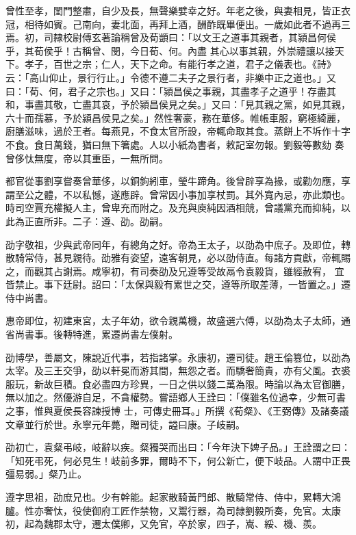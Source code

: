 \begin{pinyinscope}
 曾性至孝，閨門整肅，自少及長，無聲樂嬖幸之好。年老之後，與妻相見，皆正衣冠，相待如賓。己南向，妻北面，再拜上酒，酬酢既畢便出。一歲如此者不過再三焉。初，司隸校尉傅玄著論稱曾及荀顗曰：「以文王之道事其親者，其潁昌何侯乎，其荀侯乎！古稱曾、閔，今日荀、何。內盡
 其心以事其親，外崇禮讓以接天下。孝子，百世之宗；仁人，天下之命。有能行孝之道，君子之儀表也。《詩》云：「高山仰止，景行行止。」令德不遵二夫子之景行者，非樂中正之道也。」又曰：「荀、何，君子之宗也。」又曰：「潁昌侯之事親，其盡孝子之道乎！存盡其和，事盡其敬，亡盡其哀，予於潁昌侯見之矣。」又曰：「見其親之黨，如見其親，六十而孺慕，予於潁昌侯見之矣。」然性奢豪，務在華侈。帷帳車服，窮極綺麗，廚膳滋味，過於王者。每燕見，不食太官所設，帝輒命取其食。蒸餅上不坼作十字不食。食日萬錢，猶曰無下箸處。人以小紙為書者，敕記室勿報。劉毅等數劾
 奏曾侈忲無度，帝以其重臣，一無所問。



 都官從事劉享嘗奏曾華侈，以銅鉤紖車，瑩牛蹄角。後曾辟享為掾，或勸勿應，享謂至公之體，不以私憾，遂應辟。曾常因小事加享杖罰。其外寬內忌，亦此類也。時司空賈充權擬人主，曾卑充而附之。及充與庾純因酒相競，曾議黨充而抑純，以此為正直所非。二子：遵、劭。劭嗣。



 劭字敬祖，少與武帝同年，有總角之好。帝為王太子，以劭為中庶子。及即位，轉散騎常侍，甚見親待。劭雅有姿望，遠客朝見，必以劭侍直。每諸方貢獻，帝輒賜之，而觀其占謝焉。咸寧初，有司奏劭及兄遵等受故鬲令袁毅貨，雖經赦宥，
 宜皆禁止。事下廷尉。詔曰：「太保與毅有累世之交，遵等所取差薄，一皆置之。」遷侍中尚書。



 惠帝即位，初建東宮，太子年幼，欲令親萬機，故盛選六傅，以劭為太子太師，通省尚書事。後轉特進，累遷尚書左僕射。



 劭博學，善屬文，陳說近代事，若指諸掌。永康初，遷司徒。趙王倫篡位，以劭為太宰。及三王交爭，劭以軒冕而游其間，無怨之者。而驕奢簡貴，亦有父風。衣裘服玩，新故巨積。食必盡四方珍異，一日之供以錢二萬為限。時論以為太官御膳，無以加之。然優游自足，不貪權勢。嘗語鄉人王詮曰：「僕雖名位過幸，少無可書之事，惟與夏侯長容諫授博
 士，可傳史冊耳。」所撰《荀粲》、《王弼傳》及諸奏議文章並行於世。永寧元年薨，贈司徒，謚曰康。子岐嗣。



 劭初亡，袁粲弔岐，岐辭以疾。粲獨哭而出曰：「今年決下婢子品。」王詮謂之曰：「知死弔死，何必見生！岐前多罪，爾時不下，何公新亡，便下岐品。人謂中正畏彊易弱。」粲乃止。



 遵字思祖，劭庶兄也。少有幹能。起家散騎黃門郎、散騎常侍、侍中，累轉大鴻臚。性亦奢忲，役使御府工匠作禁物，又鬻行器，為司隸劉毅所奏，免官。太康初，起為魏郡太守，遷太僕卿，又免官，卒於家，四子，嵩、綏、機、羨。




\end{pinyinscope}
